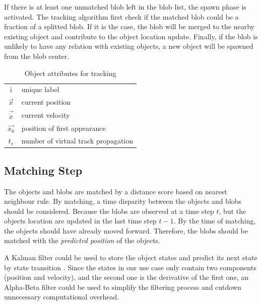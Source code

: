 If there is at least one unmatched blob left in the blob list, the spawn phase is activated. The tracking algorithm first check if the matched blob could be a fraction of a splitted blob. If it is the case, the blob will be merged to the nearby existing object and contribute to the object location update. Finally, if the blob is unlikely to have any relation with existing objects, a new object will be spawned from the blob center.
\begin{table}
  \centering
  \begin{tabular}{|c|l|}
    \hline
    i & unique label \\
    $\vec{x}$ & current position \\
    $\vec{\dot{x}}$ & current velocity \\
    $\vec{x_0}$ & position of first appearance \\
    $t_v$ & number of virtual track propagation \\
    \hline
  \end{tabular}
  \caption{Object attributes for tracking}\label{tab:objectattributes}
\end{table}

\subsection{Matching Step}
The objects and blobs are matched by a distance score based on nearest neighbour rule. By matching, a time disparity between the objects and blobs should be considered. Because the blobs are observed at a time step $t$, but the objects location are updated in the last time step $t-1$. By the time of matching, the objects should have already moved forward. Therefore, the blobs should be matched with the \emph{predicted position} of the objects.

A Kalman filter could be used to store the object states and predict its next state by state transition \cite{mika,virtualtrack}. Since the states in our use case only contain two components (position and velocity), and the second one is the derivative of the first one, an Alpha-Beta filter could be used to simplify the filtering process and cutdown unnecessary computational overhead.

